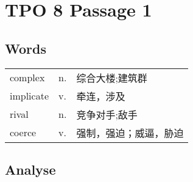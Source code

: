 \section{TPO 8 Passage 1}

\subsection{Words}

\begin{tabular}{lll}
    complex   & n. & 综合大楼;建筑群    \\
    implicate & v. & 牵连，涉及       \\
    rival     & n. & 竞争对手;敌手     \\
    coerce    & v. & 强制，强迫；威逼，胁迫 \\
\end{tabular}

\subsection{Analyse}


